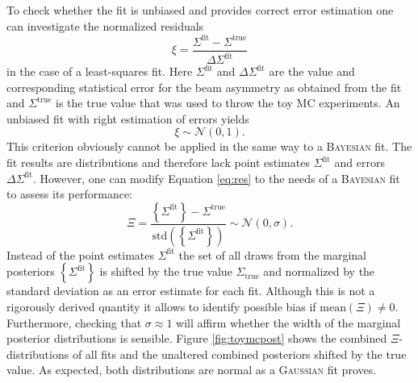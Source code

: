 \noindent To check whether the fit is unbiased and provides correct error estimation one can investigate the normalized residuals
\begin{equation}
	\xi = \frac{\Sigma^\text{fit}-\Sigma^\text{true}}{\Delta\Sigma^\text{fit}}
	\label{eq:res}
\end{equation}
 in the case of a least-squares fit. Here $\Sigma^\text{fit}$ and $\Delta\Sigma^\text{fit}$ are the value and corresponding statistical error for the beam asymmetry as obtained from the fit and $\Sigma^\text{true}$ is the true value that was used to throw the toy MC experiments. An unbiased fit with right estimation of errors yields \cite{statistics} \begin{equation}
	\xi\sim\mathcal{N}\left(0,1\right).
	\label{eq:xi}
\end{equation}
This criterion obviously cannot be applied in the same way to a \textsc{Bayesian} fit. The fit results are distributions and therefore lack point estimates $\Sigma^\text{fit}$ and errors $\Delta\Sigma^\text{fit}$. However, one can modify Equation \eqref{eq:res} to the needs of a \textsc{Bayesian} fit to assess its performance:
\begin{equation}
	\Xi=\frac{\left\{\Sigma^\text{fit}\right\}-\Sigma^\text{true}}{\text{std}\left(\left\{\Sigma^\text{fit}\right\}\right)}\sim\mathcal{N}(0,\sigma).
\end{equation}
Instead of the point estimates $\Sigma^\text{fit}$ the set of all draws from the marginal posteriors $\left\{\Sigma^\text{fit}\right\}$ is shifted by the true value $\Sigma_\text{true}$ and normalized by the standard deviation as an error estimate for each fit. Although this is not a rigorously derived quantity it allows to identify possible bias if $\text{mean}\left(\Xi\right)\neq 0$. Furthermore, checking that $\sigma\approx1$ will affirm whether the width of the marginal posterior distributions is sensible. Figure \ref{fig:toymcpost} shows the combined $\Xi$-distributions of all fits and the unaltered combined posteriors shifted by the true value. As expected, both distributions are normal as a \textsc{Gaussian} fit proves.  
